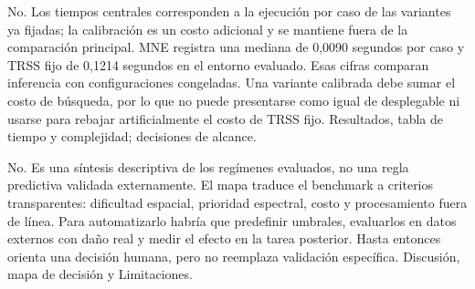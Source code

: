 {No. Los tiempos centrales corresponden a la ejecución por caso de las variantes ya fijadas; la calibración es un costo adicional y se mantiene fuera de la comparación principal.}
{MNE registra una mediana de 0,0090 segundos por caso y TRSS fijo de 0,1214 segundos en el entorno evaluado. Esas cifras comparan inferencia con configuraciones congeladas. Una variante calibrada debe sumar el costo de búsqueda, por lo que no puede presentarse como igual de desplegable ni usarse para rebajar artificialmente el costo de TRSS fijo.}
{Resultados, tabla de tiempo y complejidad; decisiones de alcance.}

{No. Es una síntesis descriptiva de los regímenes evaluados, no una regla predictiva validada externamente.}
{El mapa traduce el benchmark a criterios transparentes: dificultad espacial, prioridad espectral, costo y procesamiento fuera de línea. Para automatizarlo habría que predefinir umbrales, evaluarlos en datos externos con daño real y medir el efecto en la tarea posterior. Hasta entonces orienta una decisión humana, pero no reemplaza validación específica.}
{Discusión, mapa de decisión y Limitaciones.}
